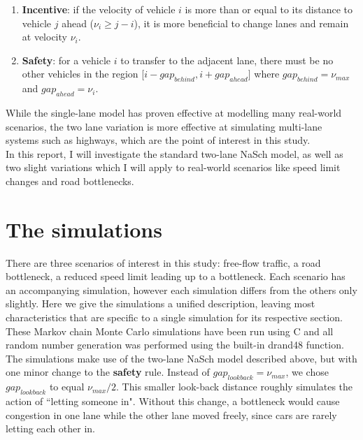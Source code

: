\documentclass[11pt]{article}
\begin{document}
	\begin{enumerate}
		\item \textbf{Incentive}: if the velocity of vehicle $i$ is more than or equal to its distance to vehicle $j$ ahead ($\nu_i \geq j-i$), it is more beneficial to change lanes and remain at velocity $\nu_i$.
		\item \textbf{Safety}: for a vehicle $i$ to transfer to the adjacent lane, there must be no other vehicles in the region [$i-gap_{behind}, i+gap_{ahead}]$ where $gap_{behind} = \nu_{max}$ and $gap_{ahead} = \nu_i$.
	\end{enumerate}
	
	While the single-lane model has proven effective at modelling many real-world scenarios, the two lane variation is more effective at simulating multi-lane systems such as highways, which are the point of interest in this study.\\ 
	
	In this report, I will investigate the standard two-lane NaSch model, as well as two slight variations which I will apply to real-world scenarios like speed limit changes and road bottlenecks. 
	
	\section{The simulations}
	
	There are three scenarios of interest in this study: free-flow traffic, a road bottleneck, a reduced speed limit leading up to a bottleneck. Each scenario has an accompanying simulation, however each simulation differs from the others only slightly. Here we give the simulations a unified description, leaving most characteristics that are specific to a single simulation for its respective section.\\
	
	These Markov chain Monte Carlo simulations have been run using C and all random number generation was performed using the built-in drand48 function. The simulations make use of the two-lane NaSch model described above, but with one minor change to the \textbf{safety} rule. Instead of $gap_{lookback} = \nu_{max}$, we chose $gap_{lookback}$ to equal $\nu_{max}/2$. This smaller look-back distance roughly simulates the action of ``letting someone in". Without this change, a bottleneck would cause congestion in one lane while the other lane moved freely, since cars are rarely letting each other in. \\
	
\end{document}
